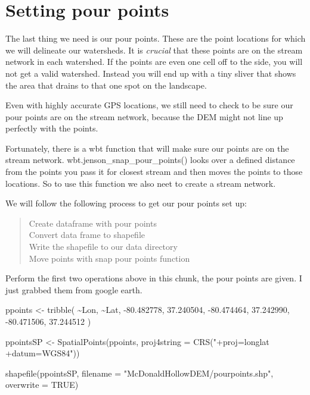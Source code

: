 \documentclass[
]{book}
\newenvironment{Shaded}{\begin{snugshade}}{\end{snugshade}}
\newcommand{\AttributeTok}[1]{\textcolor[rgb]{0.77,0.63,0.00}{#1}}
\newcommand{\ConstantTok}[1]{\textcolor[rgb]{0.00,0.00,0.00}{#1}}
\newcommand{\FloatTok}[1]{\textcolor[rgb]{0.00,0.00,0.81}{#1}}
\newcommand{\FunctionTok}[1]{\textcolor[rgb]{0.00,0.00,0.00}{#1}}
\newcommand{\NormalTok}[1]{#1}
\newcommand{\OtherTok}[1]{\textcolor[rgb]{0.56,0.35,0.01}{#1}}
\newcommand{\SpecialCharTok}[1]{\textcolor[rgb]{0.00,0.00,0.00}{#1}}
\newcommand{\StringTok}[1]{\textcolor[rgb]{0.31,0.60,0.02}{#1}}
\begin{document}
\hypertarget{setting-pour-points}{%
\section{Setting pour points}\label{setting-pour-points}}

The last thing we need is our pour points. These are the point locations for which we will delineate our watersheds. It is \emph{crucial} that these points are on the stream network in each watershed. If the points are even one cell off to the side, you will not get a valid watershed. Instead you will end up with a tiny sliver that shows the area that drains to that one spot on the landscape.

Even with highly accurate GPS locations, we still need to check to be sure our pour points are on the stream network, because the DEM might not line up perfectly with the points.

Fortunately, there is a wbt function that will make sure our points are on the stream network. wbt.jenson\_snap\_pour\_points() looks over a defined distance from the points you pass it for closest stream and then moves the points to those locations. So to use this function we also neet to create a stream network.

We will follow the following process to get our pour points set up:

\begin{quote}
Create dataframe with pour points\\
Convert data frame to shapefile\\
Write the shapefile to our data directory\\
Move points with snap pour points function
\end{quote}

Perform the first two operations above in this chunk, the pour points are given. I just grabbed them from google earth.

\begin{Shaded}
\begin{Highlighting}[]
\NormalTok{ppoints }\OtherTok{\textless{}{-}} \FunctionTok{tribble}\NormalTok{(}
          \SpecialCharTok{\textasciitilde{}}\NormalTok{Lon, }\SpecialCharTok{\textasciitilde{}}\NormalTok{Lat,}
          \SpecialCharTok{{-}}\FloatTok{80.482778}\NormalTok{, }\FloatTok{37.240504}\NormalTok{,}
          \SpecialCharTok{{-}}\FloatTok{80.474464}\NormalTok{, }\FloatTok{37.242990}\NormalTok{,}
          \SpecialCharTok{{-}}\FloatTok{80.471506}\NormalTok{, }\FloatTok{37.244512}
\NormalTok{          )}

\NormalTok{ppointsSP }\OtherTok{\textless{}{-}} \FunctionTok{SpatialPoints}\NormalTok{(ppoints, }\AttributeTok{proj4string =} \FunctionTok{CRS}\NormalTok{(}\StringTok{"+proj=longlat +datum=WGS84"}\NormalTok{))}

\FunctionTok{shapefile}\NormalTok{(ppointsSP, }\AttributeTok{filename =} \StringTok{"McDonaldHollowDEM/pourpoints.shp"}\NormalTok{, }\AttributeTok{overwrite =} \ConstantTok{TRUE}\NormalTok{)}
\end{Highlighting}
\end{Shaded}
\end{document}
